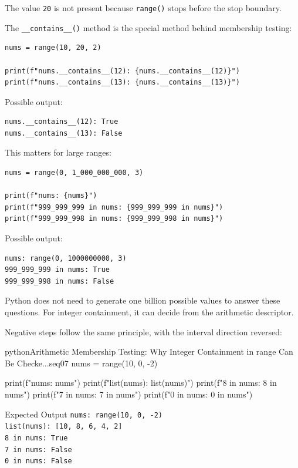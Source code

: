 \documentclass[a4paper,twoside]{report}
\begin{document}
The value \texttt{20} is not present because \texttt{range()} stops before the stop boundary.

The \texttt{\_\_contains\_\_()} method is the special method behind membership testing:

\begin{verbatim}
nums = range(10, 20, 2)

print(f"nums.__contains__(12): {nums.__contains__(12)}")
print(f"nums.__contains__(13): {nums.__contains__(13)}")
\end{verbatim}

Possible output:

\begin{verbatim}
nums.__contains__(12): True
nums.__contains__(13): False
\end{verbatim}

This matters for large ranges:

\begin{verbatim}
nums = range(0, 1_000_000_000, 3)

print(f"nums: {nums}")
print(f"999_999_999 in nums: {999_999_999 in nums}")
print(f"999_999_998 in nums: {999_999_998 in nums}")
\end{verbatim}

Possible output:

\begin{verbatim}
nums: range(0, 1000000000, 3)
999_999_999 in nums: True
999_999_998 in nums: False
\end{verbatim}

Python does not need to generate one billion possible values to answer these questions. For integer containment, it can decide from the arithmetic descriptor.

Negative steps follow the same principle, with the interval direction reversed:

\begin{codebox}[]{python}{Arithmetic Membership Testing: Why Integer Containment in range Can Be Checke...}{seq07}
nums = range(10, 0, -2)

print(f"nums: {nums}")
print(f"list(nums): {list(nums)}")
print(f"8 in nums: {8 in nums}")
print(f"7 in nums: {7 in nums}")
print(f"0 in nums: {0 in nums}")
\end{codebox}


\begin{iobox}{Expected Output}
\texttt{nums: range(10, 0, -2)} \\
\texttt{list(nums): [10, 8, 6, 4, 2]} \\
\texttt{8 in nums: True} \\
\texttt{7 in nums: False} \\
\texttt{0 in nums: False} \\
\end{iobox}
\end{document}
